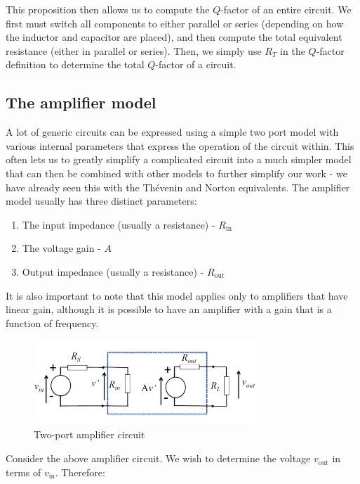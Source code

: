 \documentclass{article}
\begin{document}
This proposition then allows us to compute the $Q$-factor of an entire circuit. We first must switch all components to either parallel or series (depending on how the inductor and capacitor are placed), and then compute the total equivalent resistance (either in parallel or series). Then, we simply use $R_T$ in the $Q$-factor definition to determine the total $Q$-factor of a circuit.

\newpage

\subsection{The amplifier model}

A lot of generic circuits can be expressed using a simple two port model with various internal parameters that express the operation of the circuit within. This often lets us to greatly simplify a complicated circuit into a much simpler model that can then be combined with other models to further simplify our work - we have already seen this with the Thévenin and Norton equivalents. The amplifier model usually has three distinct parameters:

\begin{enumerate}
    \item The input impedance (usually a resistance) - $R_{\text{in}}$
    \item The voltage gain - $A$
    \item Output impedance (usually a resistance) - $R_{\text{out}}$
\end{enumerate}

It is also important to note that this model applies only to amplifiers that have linear gain, although it is possible to have an amplifier with a gain that is a function of frequency.

\begin{figure}[h]
    \centering
    \includegraphics[width=0.75\textwidth]{images/amplifier1.png}
    \caption{Two-port amplifier circuit}
    \label{fig:amplifier}
\end{figure}

Consider the above amplifier circuit. We wish to determine the voltage $v_{\text{out}}$ in terms of $v_{\text{in}}$. Therefore:
\end{document}
